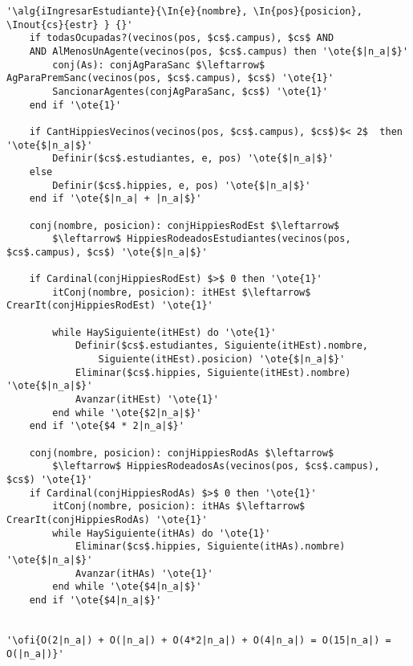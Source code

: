 \begin{lstlisting}[mathescape]
'\alg{iIngresarEstudiante}{\In{e}{nombre}, \In{pos}{posicion}, \Inout{cs}{estr} } {}'
	if todasOcupadas?(vecinos(pos, $cs$.campus), $cs$ AND 
	AND AlMenosUnAgente(vecinos(pos, $cs$.campus) then '\ote{$|n_a|$}'
		conj(As): conjAgParaSanc $\leftarrow$ AgParaPremSanc(vecinos(pos, $cs$.campus), $cs$) '\ote{1}'
		SancionarAgentes(conjAgParaSanc, $cs$) '\ote{1}'
	end if '\ote{1}'

	if CantHippiesVecinos(vecinos(pos, $cs$.campus), $cs$)$< 2$  then '\ote{$|n_a|$}'
		Definir($cs$.estudiantes, e, pos) '\ote{$|n_a|$}'
	else
		Definir($cs$.hippies, e, pos) '\ote{$|n_a|$}'
	end if '\ote{$|n_a| + |n_a|$}'
	
	conj(nombre, posicion): conjHippiesRodEst $\leftarrow$ 
		$\leftarrow$ HippiesRodeadosEstudiantes(vecinos(pos, $cs$.campus), $cs$) '\ote{$|n_a|$}'

	if Cardinal(conjHippiesRodEst) $>$ 0 then '\ote{1}'
		itConj(nombre, posicion): itHEst $\leftarrow$ CrearIt(conjHippiesRodEst) '\ote{1}'
		
		while HaySiguiente(itHEst) do '\ote{1}'
			Definir($cs$.estudiantes, Siguiente(itHEst).nombre, 
				Siguiente(itHEst).posicion) '\ote{$|n_a|$}'
			Eliminar($cs$.hippies, Siguiente(itHEst).nombre) '\ote{$|n_a|$}'
			Avanzar(itHEst) '\ote{1}'
		end while '\ote{$2|n_a|$}'
	end if '\ote{$4 * 2|n_a|$}'

	conj(nombre, posicion): conjHippiesRodAs $\leftarrow$
		$\leftarrow$ HippiesRodeadosAs(vecinos(pos, $cs$.campus), $cs$) '\ote{1}'
	if Cardinal(conjHippiesRodAs) $>$ 0 then '\ote{1}'
		itConj(nombre, posicion): itHAs $\leftarrow$ CrearIt(conjHippiesRodAs) '\ote{1}'	
		while HaySiguiente(itHAs) do '\ote{1}'
			Eliminar($cs$.hippies, Siguiente(itHAs).nombre) '\ote{$|n_a|$}'
			Avanzar(itHAs) '\ote{1}'
		end while '\ote{$4|n_a|$}'
	end if '\ote{$4|n_a|$}'
	 

'\ofi{O(2|n_a|) + O(|n_a|) + O(4*2|n_a|) + O(4|n_a|) = O(15|n_a|) = O(|n_a|)}'
\end{lstlisting}

